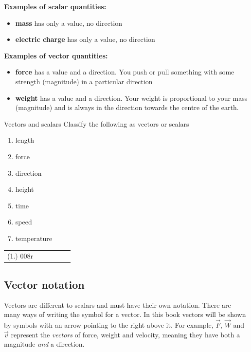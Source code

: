\textbf{Examples of scalar quantities:}
\begin{itemize}
\item \textbf{mass} has only a value, no direction
\item \textbf{electric charge} has only a value, no direction
\end{itemize}

\textbf{Examples of vector quantities:} 
\begin{itemize}
\item \textbf{force} has a value and a direction. You push or pull something with some strength (magnitude) in a particular direction 
\item \textbf{weight} has a value and a direction. Your weight is proportional to your mass (magnitude) and is always in the direction towards the centre of the earth.
\end{itemize}

\begin{exercises}{Vectors and scalars}\vspace{-1cm}
Classify the following as vectors or scalars
 \begin{enumerate}[noitemsep,label=\textbf{\arabic*}.]
\item length
\item force
\item direction
\item height
\item time
\item speed
\item temperature
 \end{enumerate}
\par \practiceinfo
 \par \begin{tabular}[h]{cccccc}
 (1.) 008r   \end{tabular}
\end{exercises}

    \label{m38812*cid4}
      \label{m38812*uid1}
\subsection*{Vector notation}
            \nopagebreak
Vectors are different to scalars and must have their own notation. There are many ways of writing the symbol for a vector. In this book vectors will be shown by symbols with an arrow pointing to the right above it. For example, $\stackrel{\to }{F}$, $\stackrel{\to }{W}$ and $\stackrel{\to }{v}$ represent the \textit{vectors} of force, weight and velocity, meaning they have both a magnitude \textit{and} a direction.

